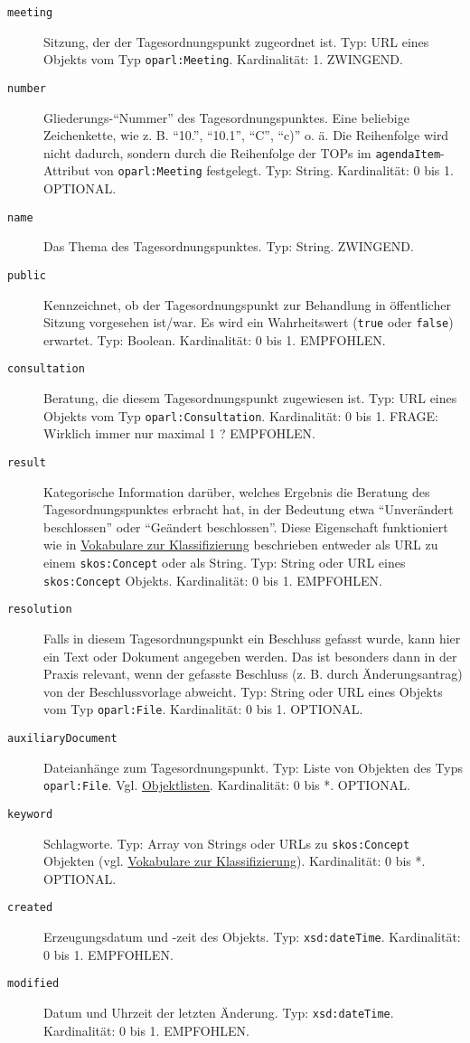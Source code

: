 \documentclass[,a4paper]{article}
\begin{document}
\begin{description}
\item[\texttt{meeting}]
Sitzung, der der Tagesordnungspunkt zugeordnet ist. Typ: URL eines
Objekts vom Typ \texttt{oparl:Meeting}. Kardinalität: 1. ZWINGEND.
\item[\texttt{number}]
Gliederungs-``Nummer'' des Tagesordnungspunktes. Eine beliebige
Zeichenkette, wie z. B. ``10.'', ``10.1'', ``C'', ``c)'' o. ä. Die
Reihenfolge wird nicht dadurch, sondern durch die Reihenfolge der TOPs
im \texttt{agendaItem}-Attribut von \texttt{oparl:Meeting} festgelegt.
Typ: String. Kardinalität: 0 bis 1. OPTIONAL.
\item[\texttt{name}]
Das Thema des Tagesordnungspunktes. Typ: String. ZWINGEND.
\item[\texttt{public}]
Kennzeichnet, ob der Tagesordnungspunkt zur Behandlung in öffentlicher
Sitzung vorgesehen ist/war. Es wird ein Wahrheitswert (\texttt{true}
oder \texttt{false}) erwartet. Typ: Boolean. Kardinalität: 0 bis 1.
EMPFOHLEN.
\item[\texttt{consultation}]
Beratung, die diesem Tagesordnungspunkt zugewiesen ist. Typ: URL eines
Objekts vom Typ \texttt{oparl:Consultation}. Kardinalität: 0 bis 1.
FRAGE: Wirklich immer nur maximal 1 ? EMPFOHLEN.
\item[\texttt{result}]
Kategorische Information darüber, welches Ergebnis die Beratung des
Tagesordnungspunktes erbracht hat, in der Bedeutung etwa ``Unverändert
beschlossen'' oder ``Geändert beschlossen''. Diese Eigenschaft
funktioniert wie in \hyperref[vokabulareux5fklassifizierung]{Vokabulare
zur Klassifizierung} beschrieben entweder als URL zu einem
\texttt{skos:Concept} oder als String. Typ: String oder URL eines
\texttt{skos:Concept} Objekts. Kardinalität: 0 bis 1. EMPFOHLEN.
\item[\texttt{resolution}]
Falls in diesem Tagesordnungspunkt ein Beschluss gefasst wurde, kann
hier ein Text oder Dokument angegeben werden. Das ist besonders dann in
der Praxis relevant, wenn der gefasste Beschluss (z. B. durch
Änderungsantrag) von der Beschlussvorlage abweicht. Typ: String oder URL
eines Objekts vom Typ \texttt{oparl:File}. Kardinalität: 0 bis 1.
OPTIONAL.
\item[\texttt{auxiliaryDocument}]
Dateianhänge zum Tagesordnungspunkt. Typ: Liste von Objekten des Typs
\texttt{oparl:File}. Vgl. \hyperref[objektlisten]{Objektlisten}.
Kardinalität: 0 bis *. OPTIONAL.
\item[\texttt{keyword}]
Schlagworte. Typ: Array von Strings oder URLs zu \texttt{skos:Concept}
Objekten (vgl. \hyperref[vokabulareux5fklassifizierung]{Vokabulare zur
Klassifizierung}). Kardinalität: 0 bis *. OPTIONAL.
\item[\texttt{created}]
Erzeugungsdatum und -zeit des Objekts. Typ: \texttt{xsd:dateTime}.
Kardinalität: 0 bis 1. EMPFOHLEN.
\item[\texttt{modified}]
Datum und Uhrzeit der letzten Änderung. Typ: \texttt{xsd:dateTime}.
Kardinalität: 0 bis 1. EMPFOHLEN.
\end{description}
\end{document}
